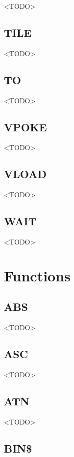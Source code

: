 <TODO>

\subsection{TILE}

<TODO>

\subsection{TO}

<TODO>

\subsection{VPOKE}

<TODO>

\subsection{VLOAD}

<TODO>

\subsection{WAIT}

<TODO>

\section{Functions}

\subsection{ABS}

<TODO>

\subsection{ASC}

<TODO>

\subsection{ATN}

<TODO>

\subsection{BIN\$}

